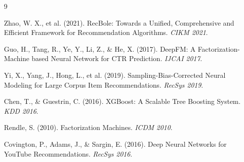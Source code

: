 \documentclass[twocolumn, 10pt, a4paper]{article}
\begin{document}
\begin{thebibliography}{9}

Zhao, W. X., et al. (2021). RecBole: Towards a Unified, Comprehensive and Efficient Framework for Recommendation Algorithms. \textit{CIKM 2021}.

Guo, H., Tang, R., Ye, Y., Li, Z., \& He, X. (2017). DeepFM: A Factorization-Machine based Neural Network for CTR Prediction. \textit{IJCAI 2017}.

Yi, X., Yang, J., Hong, L., et al. (2019). Sampling-Bias-Corrected Neural Modeling for Large Corpus Item Recommendations. \textit{RecSys 2019}.

Chen, T., \& Guestrin, C. (2016). XGBoost: A Scalable Tree Boosting System. \textit{KDD 2016}.

Rendle, S. (2010). Factorization Machines. \textit{ICDM 2010}.

Covington, P., Adams, J., \& Sargin, E. (2016). Deep Neural Networks for YouTube Recommendations. \textit{RecSys 2016}.

\end{thebibliography}
\end{document}
